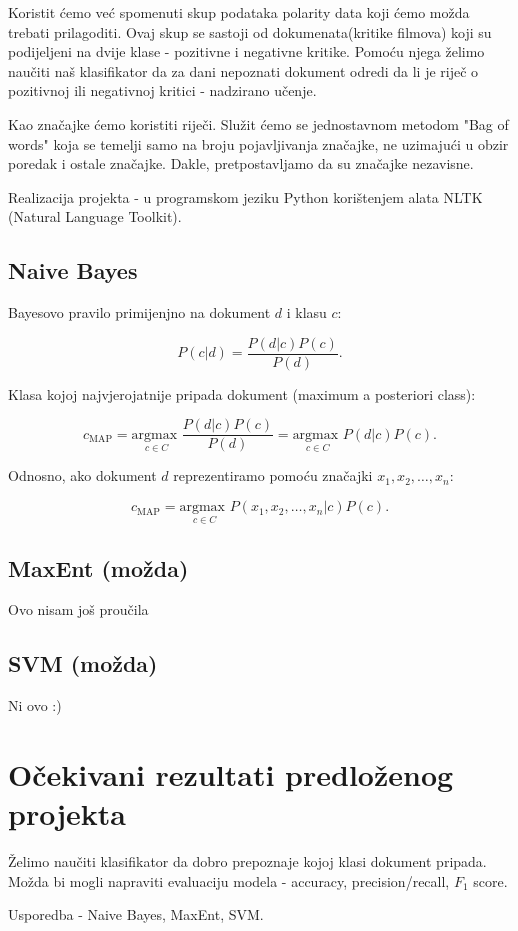\documentclass[10pt,a4paper,titlepage]{article}
\begin{document}
Koristit ćemo već spomenuti skup podataka polarity data koji ćemo možda trebati prilagoditi. Ovaj skup se sastoji od dokumenata(kritike filmova) koji su podijeljeni na dvije klase - pozitivne i negativne kritike. Pomoću njega želimo naučiti naš klasifikator da za dani nepoznati dokument odredi da li je riječ o pozitivnoj ili negativnoj kritici - nadzirano učenje.

Kao značajke ćemo koristiti riječi. Služit ćemo se jednostavnom metodom "Bag of words" koja se temelji samo na broju pojavljivanja značajke, ne uzimajući u obzir poredak i ostale značajke. Dakle, pretpostavljamo da su značajke nezavisne.

Realizacija projekta - u programskom jeziku Python korištenjem alata NLTK (Natural Language Toolkit).

\subsection{Naive Bayes}

Bayesovo pravilo primijenjno na dokument $d$ i klasu $c$:

\[P(c|d) = \frac{P(d|c)P(c)}{P(d)}.\]

Klasa kojoj najvjerojatnije pripada dokument (maximum a posteriori class):

\[c_{\text{MAP}} = \underset{{c \in C}}{\text{argmax }} \frac{P(d|c)P(c)}{P(d)}
= \underset{{c \in C}}{\text{argmax }} P(d|c)P(c).\] 

Odnosno, ako dokument $d$ reprezentiramo pomoću značajki $x_1, x_2, \ldots, x_n$:

\[c_{\text{MAP}} = \underset{{c \in C}}{\text{argmax }} P(x_1, x_2, \ldots, x_n|c)P(c).\] 

\subsection{MaxEnt (možda)}

Ovo nisam još proučila

\subsection{SVM (možda)}

Ni ovo :)

\section{Očekivani rezultati predloženog projekta}

Želimo naučiti klasifikator da dobro prepoznaje kojoj klasi dokument pripada. Možda bi mogli napraviti evaluaciju modela - accuracy, precision/recall, $F_1$ score.

Usporedba - Naive Bayes, MaxEnt, SVM.

\newpage

\nocite{Pang:2002:TUS:1118693.1118704}
\nocite{bird2009natural}



\end{document}
